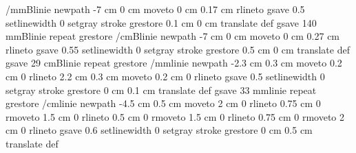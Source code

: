 {{%
 /mmBlinie { newpath
                   -7 cm 0 cm moveto
                    0 cm 0.17 cm rlineto
                     gsave
                     0.5 setlinewidth
                     0 setgray
                     stroke
                     grestore
                      0.1 cm 0 cm translate
                    } def
gsave
140 {mmBlinie} repeat
grestore
   /cmBlinie { newpath
                   -7 cm 0 cm moveto
                    0 cm 0.27 cm rlineto
                     gsave
                     0.55 setlinewidth
                     0 setgray
                     stroke
                     grestore
                      0.5 cm 0 cm translate
                    } def
gsave
   29 {cmBlinie} repeat
grestore
/mmlinie { newpath
                   -2.3 cm 0.3 cm moveto
                    0.2 cm 0 rlineto
                    2.2 cm 0.3 cm moveto
                    0.2 cm 0 rlineto
                     gsave
                     0.5 setlinewidth
                     0 setgray
                     stroke
                     grestore
                      0 cm 0.1 cm translate
                    } def
gsave
33 {mmlinie} repeat
grestore
/cmlinie { newpath
                   -4.5 cm 0.5 cm moveto
                    2 cm 0 rlineto
                    0.75 cm 0 rmoveto
                    1.5 cm 0 rlineto
                    0.5 cm 0 rmoveto
                    1.5 cm 0 rlineto
                    0.75 cm 0 rmoveto
                    2 cm 0 rlineto
                     gsave
                     0.6 setlinewidth
                     0 setgray
                     stroke
                     grestore
                      0 cm 0.5 cm translate
                   } def
}}
